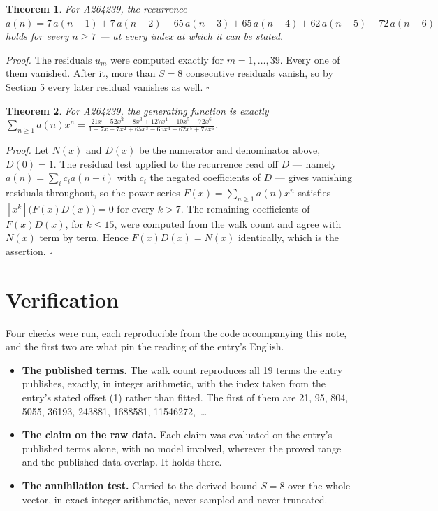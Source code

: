 \documentclass[11pt]{article}
\newtheorem{theorem}{Theorem}
\theoremstyle{definition}
\begin{document}
\begin{theorem} For A264239, the recurrence $a(n) = 7\,a(n-1) + 7\,a(n-2) - 65\,a(n-3) + 65\,a(n-4) + 62\,a(n-5) - 72\,a(n-6)$ holds for every $n \ge 7$ --- at every index at which it can be stated.\end{theorem}

{\itshape Proof.} The residuals $u_m$ were computed exactly for $m = 1,\dots,39$. Every one of them vanished. After it, more than $S = 8$ consecutive residuals vanish, so by Section 5 every later residual vanishes as well. $\square$

\begin{theorem} For A264239, the generating function is exactly $\sum_{n\ge 1} a(n)x^n = \frac{21x - 52x^{2} - 8x^{3} + 127x^{4} - 10x^{5} - 72x^{6}}{1 - 7x - 7x^{2} + 65x^{3} - 65x^{4} - 62x^{5} + 72x^{6}}$.\end{theorem}

{\itshape Proof.} Let $N(x)$ and $D(x)$ be the numerator and denominator above, $D(0)=1$. The residual test applied to the recurrence read off $D$ --- namely $a(n) = \sum_i c_i a(n-i)$ with $c_i$ the negated coefficients of $D$ --- gives vanishing residuals throughout, so the power series $F(x)=\sum_{n\ge 1}a(n)x^n$ satisfies $[x^k]\bigl(F(x)D(x)\bigr) = 0$ for every $k > 7$. The remaining coefficients of $F(x)D(x)$, for $k \le 15$, were computed from the walk count and agree with $N(x)$ term by term. Hence $F(x)D(x) = N(x)$ identically, which is the assertion. $\square$

\section{Verification}

Four checks were run, each reproducible from the code accompanying this note, and the first two are what pin the reading of the entry's English.

\begin{itemize}

\item {\bfseries The published terms.} The walk count reproduces all 19 terms the entry publishes, exactly, in integer arithmetic, with the index taken from the entry's stated offset (1) rather than fitted. The first of them are 21, 95, 804, 5055, 36193, 243881, 1688581, 11546272,~\dots

\item {\bfseries The claim on the raw data.} Each claim was evaluated on the entry's published terms alone, with no model involved, wherever the proved range and the published data overlap. It holds there.

\item {\bfseries The annihilation test.} Carried to the derived bound $S = 8$ over the whole vector, in exact integer arithmetic, never sampled and never truncated.

\end{itemize}
\end{document}

